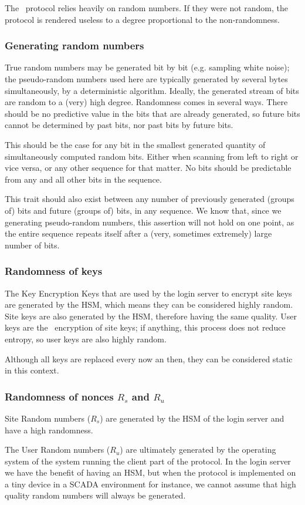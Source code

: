 The \TIMO\ protocol relies heavily on random numbers.
If they were not random, the protocol is rendered useless to a degree proportional to the non-randomness.
\subsubsection{Generating random numbers}
True random numbers may be generated bit by bit
(e.g. sampling white noise);
the pseudo-random numbers used here are typically generated by several bytes simultaneously,
by a deterministic algorithm.
Ideally,
the generated stream of bits are random to a
(very)
high degree.
Randomness comes in several ways.
There should be no predictive value in the bits that are already generated,
so future bits cannot be determined by past bits,
nor past bits by future bits.
\par
This should be the case for any bit in the smallest generated quantity of simultaneously computed random bits.
Either when scanning from left to right or vice versa, or any other sequence for that matter.
No bits should be predictable from any and all other bits in the sequence.
\par
This trait should also exist between any number of previously generated
(groups of)
bits and future
(groups of)
bits,
in any sequence.
We know that,
since we generating pseudo-random numbers,
this assertion will not hold on one point,
as the entire sequence repeats itself after a
(very,
sometimes extremely)
large number of bits.
\subsubsection{Randomness of keys}
The Key Encryption Keys that are used by the login server to encrypt site keys are generated by the HSM,
which means they can be considered highly random.
Site keys are also generated by the HSM,
therefore having the same quality.
User keys are the \AES\ encryption of site keys;
if anything,
this process does not reduce entropy,
so user keys are also highly random.
\par
Although all keys are replaced every now an then,
they can be considered static in this context.
\subsubsection{Randomness of nonces $R_s$ and $R_u$}
Site Random numbers
($R_s$)
are generated by the HSM of the login server and have a high randomness.
\par
The User Random numbers
($R_u$)
are ultimately generated by the operating system of the system running the client part of the protocol.
In the login server we have the benefit of having an HSM,
but when the protocol is implemented on a tiny device in a SCADA environment for instance,
we cannot assume that high quality random numbers will always be generated.
